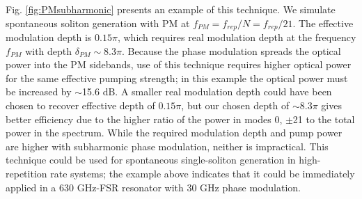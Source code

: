 Fig. \ref{fig:PMsubharmonic} presents an example of this technique. We simulate spontaneous soliton generation with PM at $f_{PM}=f_{rep}/N=f_{rep}/21$. The effective modulation depth is $0.15\pi$, which requires real modulation depth at the frequency $f_{PM}$ with depth $\delta_{PM}\sim8.3\pi$.  Because the phase modulation spreads the optical power into the PM sidebands, use of this technique requires higher optical power for the same effective pumping strength; in this example the optical power must be increased by $\sim$15.6 dB. A smaller real modulation depth could have been chosen to recover effective depth of $0.15\pi$, but our chosen depth of $\sim8.3\pi$ gives better efficiency due to the higher ratio of the power in modes $0$, $\pm$21 to the total power in the spectrum. While the required modulation depth and pump power are higher with subharmonic phase modulation, neither is impractical. This technique could be used for spontaneous single-soliton generation in high-repetition rate systems; the example above indicates that it could be immediately applied in a 630 GHz-FSR resonator with 30 GHz phase modulation. 




